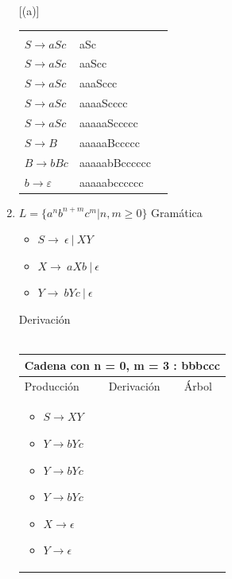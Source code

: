 \documentclass{article}
\begin{document}
\begin{enumerate} [(a)]
\begin{tabular}{|p{5cm}|p{5cm}|p{5cm}|  }
{\begin{minipage}{.3\textwidth}
            \end{minipage}
            } \\
             $ S \to aSc$ & aSc & \\
             $ S \to aSc$ & aaScc & \\
             $ S \to aSc$ & aaaSccc & \\
             $ S \to aSc$ & aaaaScccc & \\
             $ S \to aSc$ & aaaaaSccccc & \\
             
             $ S \to B$ & aaaaaBccccc & \\
             $ B \to bBc$ & aaaaabBcccccc & \\
             $ b \to \varepsilon$ & aaaaabcccccc & \\
             \hline
            \end{tabular}
	    
	    \item $L = \{a^nb^{n+m}c^m | n, m \geq 0\}$
	    Gramática
	    \begin{itemize}
            \item $S \to \ \epsilon \ | \ XY$
            \item $X \to \ aXb \ | \ \epsilon $
            \item $Y \to \ bYc \ | \ \epsilon $
        \end{itemize}
        Derivación
        \\ \\ 
        \begin{tabular}{|p{3.5cm}|p{3.5cm}|p{8cm}|  }
         \hline
         \multicolumn{3}{|c|}{Cadena con n = 0, m = 3 : bbbccc} \\
         \hline
         Producción & Derivación & Árbol\\
         \hline
         \begin{itemize}[label={}]
             
             
         \item $ S \to XY$
         \item $ Y \to bYc$	
         \item $ Y \to bYc$	
         \item $ Y \to bYc$	
         \item $ X \to \epsilon$	
         \item $ Y \to \epsilon$	
         
         
        \end{itemize}
        &
        \begin{itemize}[label={}]
             

\end{itemize}
\end{tabular}
\end{enumerate}
\end{document}
